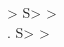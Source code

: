 \documentclass{article}
\begin{document}
\begin{beltgrid}[view=wires]
> S> > \\
. S> >
\end{beltgrid}
\end{document}
